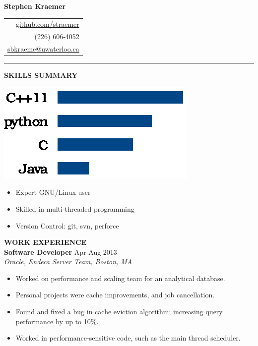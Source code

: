 \documentclass{letter}
\begin{document}
{\Huge\bf Stephen Kraemer} \hfill
\begin{tabular}{r}
  \href{https://github.com/straemer}{github.com/straemer} \\
  (226) 606-4052 \\
  \href{mailto:sbkraeme@uwaterloo.ca}{sbkraeme@uwaterloo.ca}
\end{tabular}

\vskip 2pt
\hrule

{\large\bf SKILLS SUMMARY} \\
\begin{minipage}{0.35\textwidth}
  \includegraphics{programming_languages.eps}
\end{minipage}
\begin{minipage}{0.65\textwidth}
  \begin{itemize}
    \item Expert GNU/Linux user
    \item Skilled in multi-threaded programming
    \item Version Control: git, svn, perforce
  \end{itemize}
\end{minipage}


{\large\bf WORK EXPERIENCE} \\
{\bf Software Developer} \hfill Apr-Aug 2013 \\
{\sl Oracle, Endeca Server Team, Boston, MA}
\begin{itemize}
  \item Worked on performance and scaling team for an analytical database.
  \item Personal projects were cache improvements, and job cancellation.
  \item Found and fixed a bug in cache eviction algorithm; increasing query performance by up to 10\%.
  \item Worked in performance-sensitive code, such as the main thread scheduler.
\end{itemize}
\end{document}
